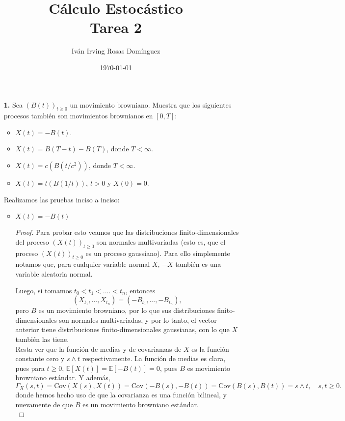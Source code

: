 \documentclass[letterpaper]{article}
\title{\textbf{Cálculo Estocástico\\
Tarea 2}}
\author{Iván Irving Rosas Domínguez}
\date{\today}
\newcommand{\E}{\mathbb{E}}
\newcommand{\1}{\mathds{1}}
\theoremstyle{definition}
\theoremstyle{definition}
\theoremstyle{definition}
\theoremstyle{definition}
\theoremstyle{definition}
\begin{document}
\maketitle

\begin{enumerate}
    \item [\textbf{1.}] Sea $(B(t))_{t\geq0}$ un movimiento browniano. Muestra que los
    siguientes procesos también son movimientos brownianos en $[0,T]$:
    \begin{itemize}
        \item $X(t)=-B(t)$.
        \item $X(t)=B(T-t)-B(T)$, donde $T<\infty$.
        \item $X(t)=c(B(t/c^2))$, donde $T<\infty$.
        \item $X(t)=t(B(1/t))$, $t>0$ y $X(0)=0$.
    \end{itemize}
    Realizamos las pruebas inciso a inciso:
     \begin{itemize}
        \item $X(t)=-B(t)$
         \begin{proof} 
         Para probar esto veamos que las distribuciones finito-dimensionales del proceso $(X(t))_{t\geq0}$
         son normales multivariadas (esto es, que el proceso $(X(t))_{t\geq0}$ es un proceso gaussiano).
         Para ello simplemente notamos que, para cualquier variable normal $X$, $-X$ también es una
         variable aleatoria normal.
         \newline
         
         Luego, si tomamos $t_0<t_1<....<t_n$, entonces 
         \[
         \left(X_{t_1},...,X_{t_n}\right)=\left(-B_{t_1},...,-B_{t_n}\right),   
         \]
         pero $B$ es un movimiento browniano, por lo que sus distribuciones finito-dimensionales
         son normales multivariadas, y por lo tanto, el vector anterior tiene distribuciones
         finito-dimensionales gaussianas, con lo que $X$ también las tiene.\\

         Resta ver que la función de medias y de covarianzas de $X$ es la función constante
         cero y $s\wedge t$ respectivamente. La función de medias es clara, pues para $t\geq0$,
         $\E\left[X(t)\right]=\E\left[-B(t)\right]=0$, pues $B$ es movimiento browniano estándar. Y además,
         \[
         \Gamma_X(s,t)=\text{Cov}\left(X(s),X(t)\right)=\text{Cov}(-B(s),-B(t))=\text{Cov}(B(s),B(t))=s\wedge t, \quad s,t\geq0.
         \]
         donde hemos hecho uso de que la covarianza es una función bilineal, y nuevamente
         de que $B$ es un movimiento browniano estándar. 
         \\


\end{proof}
\end{itemize}
\end{enumerate}
\end{document}
